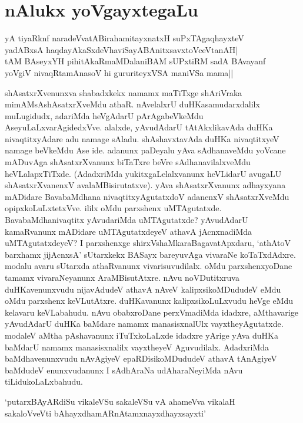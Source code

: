\chapter{nAlukx yoVgayxtegaLu}

\begin{shloka}
yA tiyaRknf naradeVvatABirahamitayxnatxH suPxTAgaqhayxteV\\
yadABxsA haqdayAkaSxdeVhaviSayABAnitxsavxtoV\s ceVtanAH|\\
tAM BAseyxYH pihitAkaRmaMDalaniBAM sUPxtiRM sadA BAvayanf\\
yoVgiV nivaqRtamAnasoV hi gururiteyxVSA maniVSa mama||
\end{shloka}

shAsatxrXvenunxva shabadxkekx namamx maTiTxge shAriVraka mimAMsAshAsatxrXveMdu athaR. nAvelalxrU duHKasamudarxdalilx muLugidudx, adariMda heVgAdarU pArAgabeVkeMdu AseyuLaLxvarAgidedxVve. alalxde, yAvudAdarU tAtAkxlikavAda duHKa nivaqtitxyAdare adu namage sAladu. shAshavxtavAda duHKa nivaqtitxyeV namage beVkeMdu Ase ide. adanunx paDeyalu yAva sAdhanaveMdu yoVcane mADuvAga shAsatxrXvanunx biTaTxre beVre sAdhanavilalxveMdu heVLalapxTiTxde. (AdadxriMda yukitxgaLelalxvanunx heVLidarU avugaLU shAsatxrXvanenxV avalaMBisirutatxve). yAva shAsatxrXvanunx adhayxyana mADidare BavabaMdhana nivaqtitxyAgutatxdoV adanenxV shAsatxrXveMdu opipxkoLuLxtetxVve. ililx oMdu parxshenx uMTAgutatxde. BavabaMdhanivaqtitx yAvudariMda uMTAgutatxde? yAvudAdarU kamaRvanunx mADidare uMTAgutatxdeyeV athavA jAcnxnadiMda uMTAgutatxdeyeV? I parxshenxge shirxVshaMkaraBagavatApxdaru, `athAtoV barxhamx jijAcnxsA' sUtarxkekx BASayx bareyuvAga vivaraNe koTaTxdAdxre. modalu avaru sUtarxda athaRvanunx vivarisuvudilalx. oMdu parxshenxyoDane tamamx vivaraNeyanunx AraMBisutAtxre. nAvu noVDutitxruva duHKavenunxvudu nijavAdudeV athavA nAveV kalipxsikoMDududeV eMdu oMdu parxshenx keVLutAtxre. duHKavanunx kalipxsikoLuLxvudu heVge eMdu kelavaru keVLabahudu. nAvu obabxroDane perxVmadiMda idadxre, aMthavarige yAvudAdarU duHKa baMdare namamx manasisxnalUlx vayxtheyAgutatxde. modaleV aMtha pAshavanunx iTuTxkoLaLxde idadxre yArige yAva duHKa baMdarU namamx manasisxnalilx vayxtheyeV Aguvudilalx. AdadxriMda baMdhavenunxvudu nAvAgiyeV epaRDisikoMDududeV athavA tAnAgiyeV baMdudeV enunxvudanunx I sAdhAraNa udAharaNeyiMda nAvu tiLidukoLaLxbahudu.

\begin{shloka}
`putarxBAyARdiSu vikaleVSu sakaleVSu vA ahameVva vikalaH\\
sakaloVveVti bAhayxdhamARnAtamxnayxdhayxsayxti'
\end{shloka} 

